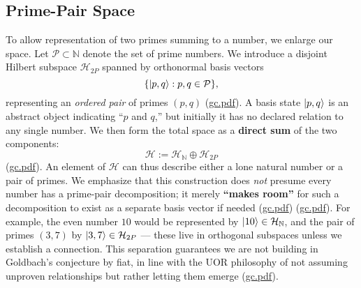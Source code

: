 \documentclass[12pt]{article}
\begin{document}
\subsection{Prime-Pair Space}
To allow representation of two primes summing to a number, we enlarge our space. Let $\mathcal{P}\subset \mathbb{N}$ denote the set of prime numbers. We introduce a disjoint Hilbert subspace $\mathcal{H}_{2P}$ spanned by orthonormal basis vectors 
\[
\{\ket{p,q}: p,q\in\mathcal{P}\},
\]
representing an \textit{ordered pair} of primes $(p,q)$ (\href{file://file-7ZYYwSHWVa83XEVTrEhg5z#:~:text=Definition%203%20,state%20indicating%20a%20%E2%80%9Cpair%E2%80%9D%20of}{gc.pdf}). A basis state $\ket{p,q}$ is an abstract object indicating “$p$ and $q$,” but initially it has no declared relation to any single number. We then form the total space as a \textbf{direct sum} of the two components:
\[
\mathcal{H} := \mathcal{H}_{\mathbb{N}} \oplus \mathcal{H}_{2P}
\]
(\href{file://file-7ZYYwSHWVa83XEVTrEhg5z#:~:text=direct%20sum}{gc.pdf}). An element of $\mathcal{H}$ can thus describe either a lone natural number or a pair of primes. We emphasize that this construction does \textit{not} presume every number has a prime-pair decomposition; it merely \textbf{``makes room''} for such a decomposition to exist as a separate basis vector if needed (\href{file://file-7ZYYwSHWVa83XEVTrEhg5z#:~:text=%5Cmathcal,H%7D%24%20as%20the%20direct%20sum}{gc.pdf}) (\href{file://file-7ZYYwSHWVa83XEVTrEhg5z#:~:text=Remark%3A%20The%20separation%20between%20%24%5Cmathcal,Goldbach%20pair%20axioms%20externally%2C%20but}{gc.pdf}). For example, the even number $10$ would be represented by $\ket{10}\in\mathcal{H}_{\mathbb{N}}$, and the pair of primes $(3,7)$ by $\ket{3,7}\in\mathcal{H}_{2P}$ --- these live in orthogonal subspaces unless we establish a connection. This separation guarantees we are not building in Goldbach’s conjecture by fiat, in line with the UOR philosophy of not assuming unproven relationships but rather letting them emerge (\href{file://file-7ZYYwSHWVa83XEVTrEhg5z#:~:text=Remark%3A%20The%20separation%20between%20%24%5Cmathcal,Goldbach%20pair%20axioms%20externally%2C%20but}{gc.pdf}).
\end{document}
